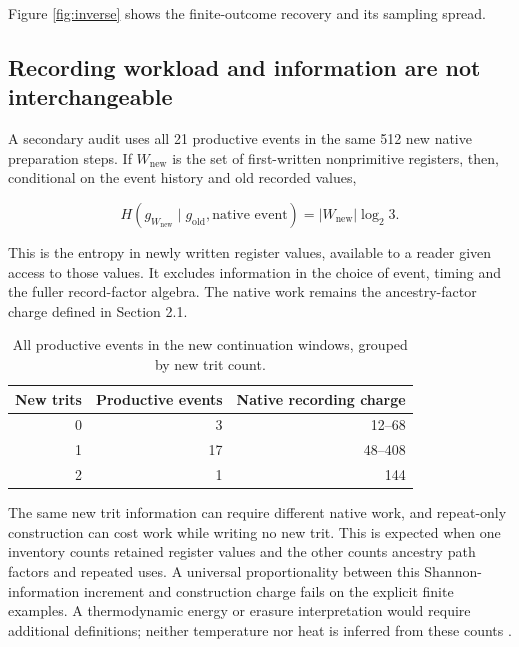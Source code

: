 \documentclass[11pt,a4paper]{article}
\begin{document}
Figure \ref{fig:inverse} shows the finite-outcome recovery and its sampling spread.

\subsection{Recording workload and information are not interchangeable}\label{recording-workload-and-information-are-not-interchangeable}

A secondary audit uses all 21 productive events in the same 512 new native preparation steps. If \(W_{\mathrm{new}}\) is the set of first-written nonprimitive registers, then, conditional on the event history and old recorded values,

\begin{equation}\label{eq:23}
H(g_{W_{\mathrm{new}}}\mid g_{\mathrm{old}},\text{native event})
=|W_{\mathrm{new}}|\log_2 3.
\end{equation}

This is the entropy in newly written register values, available to a reader given access to those values. It excludes information in the choice of event, timing and the fuller record-factor algebra. The native work remains the ancestry-factor charge defined in Section 2.1.

\begin{table}[htbp]\centering
\caption{All productive events in the new continuation windows, grouped by new trit count.}\label{tab:work}
\small\setlength{\tabcolsep}{5pt}\renewcommand{\arraystretch}{1.15}
\begin{tabular}{@{}rrr@{}}

\toprule\noalign{}
New trits & Productive events & Native recording charge \\
\midrule\noalign{}

0 & 3 & 12--68 \\
1 & 17 & 48--408 \\
2 & 1 & 144 \\
\bottomrule
\end{tabular}
\end{table}

The same new trit information can require different native work, and repeat-only construction can cost work while writing no new trit. This is expected when one inventory counts retained register values and the other counts ancestry path factors and repeated uses. A universal proportionality between this Shannon-information increment and construction charge fails on the explicit finite examples. A thermodynamic energy or erasure interpretation would require additional definitions; neither temperature nor heat is inferred from these counts \cite{R39}.
\end{document}
